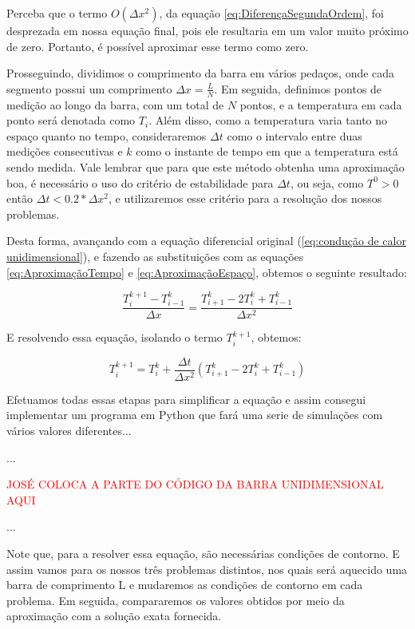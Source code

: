 \documentclass[final,5p,times,twocolumn]{elsarticle}
\begin{document}
Perceba que o termo $O(\Delta x^2)$, da equação \ref{eq:DiferençaSegundaOrdem}, foi desprezada em nossa equação final, pois ele resultaria em um valor muito próximo de zero. Portanto, é possível aproximar esse termo como zero.

Prosseguindo, dividimos o comprimento da barra em vários pedaços, onde cada segmento possui um comprimento $\Delta x = \frac{L}{N}$. Em seguida, definimos pontos de medição ao longo da barra, com um total de $N$ pontos, e a temperatura em cada ponto será denotada como $T_i$. Além disso, como a temperatura varia tanto no espaço quanto no tempo, consideraremos $\Delta t$ como o intervalo entre duas medições consecutivas e $k$ como o instante de tempo em que a temperatura está sendo medida. Vale lembrar que para que este método obtenha uma aproximação boa, é necessário o uso do critério de estabilidade para $\Delta t$, ou seja, como $T^0 > 0$ então $\Delta t < 0.2*\Delta x^2$, e utilizaremos esse critério para a resolução dos nossos problemas.

Desta forma, avançando com a equação diferencial original (\ref{eq:condução de calor unidimensional}), e fazendo as substituições com as equações \ref{eq:AproximaçãoTempo} e \ref{eq:AproximaçãoEspaço}, obtemos o seguinte resultado:

\begin{equation*}
    \frac{T_i^{k+1}-T_{i-1}^k}{\Delta x} = \frac{T_{i+1}^k - 2T_i^k + T_{i-1}^k}{\Delta x^2}
\end{equation*}

E resolvendo essa equação, isolando o termo $T_i^{k+1}$, obtemos:

\begin{equation}
    T_i^{k+1} = T_i^k + \frac{\Delta t}{\Delta x^2}(T_{i+1}^k - 2T_i^k + T_{i-1}^k)
\end{equation}

Efetuamos todas essas etapas para simplificar a equação e assim consegui implementar um programa em Python que fará uma serie de simulações com vários valores diferentes...

...

\textcolor{red}{JOSÉ COLOCA A PARTE DO CÓDIGO DA BARRA UNIDIMENSIONAL AQUI}

...

Note que, para a resolver essa equação, são necessárias condições de contorno. E assim vamos para os nossos três problemas distintos, nos quais será aquecido uma barra de comprimento L e mudaremos as condições de contorno em cada problema. Em seguida, compararemos os valores obtidos por meio da aproximação com a solução exata fornecida.
\end{document}
